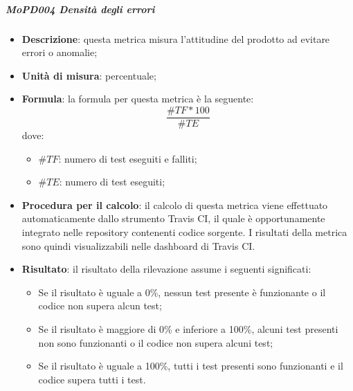 \documentclass[../norme-di-progetto.tex]{subfiles}
\begin{document}
\subparagraph{MoPD004 Densità degli errori}
\begin{itemize}
  \item \textbf{Descrizione}: questa metrica misura l'attitudine del prodotto ad evitare errori o anomalie;
  \item \textbf{Unità di misura}: percentuale;
  \item \textbf{Formula}: la formula per questa metrica è la seguente:
  \begin{displaymath}
    \frac{\#TF * 100}{\#TE}
  \end{displaymath}
  dove:
  \begin{itemize}
    \item $ \#TF $: numero di test eseguiti e falliti;
    \item $ \#TE $: numero di test eseguiti;
  \end{itemize}
  \item \textbf{Procedura per il calcolo}: il calcolo di questa metrica viene effettuato automaticamente dallo strumento Travis CI, il quale è opportunamente integrato nelle repository contenenti codice sorgente. I risultati della metrica sono quindi visualizzabili nelle dashboard di Travis CI.
  \item \textbf{Risultato}: il risultato della rilevazione assume i seguenti significati:
  \begin{itemize}
    \item Se il risultato è uguale a 0\%, nessun test presente è funzionante o il codice non supera alcun test;
    \item Se il risultato è maggiore di 0\% e inferiore a 100\%, alcuni test presenti non sono funzionanti o il codice non supera alcuni test;
    \item Se il risultato è uguale a 100\%, tutti i test presenti sono funzionanti e il codice supera tutti i test.
  \end{itemize}
\end{itemize}
\end{document}
